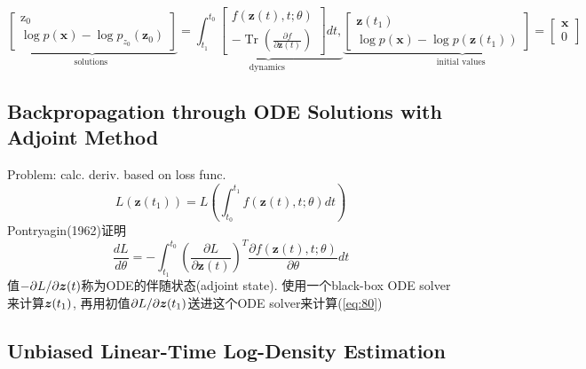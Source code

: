 \documentclass{article}
\begin{document}
    \begin{equation}
        \underbrace{\left[\begin{array}{c}
        \mathrm{z}_{0} \\
        \log p(\mathbf{x})-\log p_{z_{0}}\left(\mathbf{z}_{0}\right)
        \end{array}\right]}_{\text {solutions }}=\underbrace{\int_{t_{1}}^{t_{0}}\left[\begin{array}{c}
        f(\mathbf{z}(t), t ; \theta) \\
        -\operatorname{Tr}\left(\frac{\partial f}{\partial \mathbf{z}(t)}\right)
        \end{array}\right] d t,}_{\text {dynamics }} \underbrace{\left[\begin{array}{c}
        \mathbf{z}\left(t_{1}\right) \\
        \log p(\mathbf{x})-\log p\left(\mathbf{z}\left(t_{1}\right)\right)
        \end{array}\right]=\left[\begin{array}{l}
        \mathbf{x} \\
        0
        \end{array}\right]}_{\text {initial values }}
    \end{equation}
\subsection{Backpropagation through ODE Solutions with Adjoint Method}

    Problem: calc. deriv. based on loss func.
    \begin{equation}
        L\left(\mathbf{z}\left(t_{1}\right)\right)=L\left(\int_{t_{0}}^{t_{1}} f(\mathbf{z}(t), t ; \theta) d t\right)
    \end{equation}
    Pontryagin(1962)证明
    \begin{equation}
        \frac{d L}{d \theta}=-\int_{t_{1}}^{t_{0}}\left(\frac{\partial L}{\partial \mathbf{z}(t)}\right)^{T} \frac{\partial f(\mathbf{z}(t), t ; \theta)}{\partial \theta} d t
        \label{eq:80}
    \end{equation}
    值$-\partial L/\partial \boldsymbol{z}(t)$称为ODE的伴随状态(adjoint state). 使用一个black-box ODE solver来计算$\boldsymbol{z}(t_1)$, 再用初值$\partial L/\partial \boldsymbol{z}(t_1)$送进这个ODE solver来计算(\ref{eq:80})
\subsection{Unbiased Linear-Time Log-Density Estimation}
\end{document}
